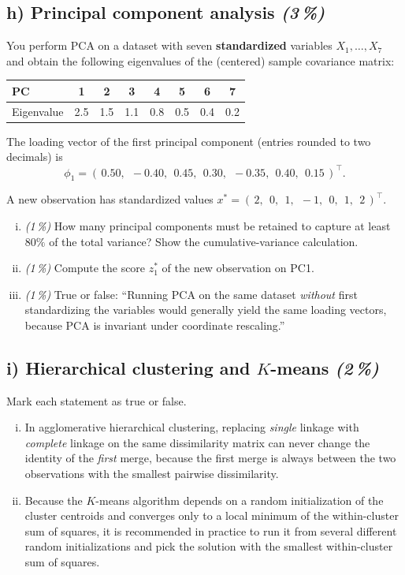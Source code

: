 \documentclass[11pt,a4paper]{article}
\newcommand{\subpoints}[1]{\textit{(#1\,\%)}}
\begin{document}
\subsection*{h) Principal component analysis \subpoints{3}}
You perform PCA on a dataset with seven \textbf{standardized} variables $X_1,\dots,X_7$ and obtain the following eigenvalues of the (centered) sample covariance matrix:
\begin{center}\small
\begin{tabular}{lccccccc}
\toprule
PC               & 1   & 2   & 3   & 4   & 5   & 6   & 7   \\
\midrule
Eigenvalue       & 2.5 & 1.5 & 1.1 & 0.8 & 0.5 & 0.4 & 0.2 \\
\bottomrule
\end{tabular}
\end{center}

The loading vector of the first principal component (entries rounded to two decimals) is
$$\phi_1 = (\,0.50,\;\, -0.40,\;\, 0.45,\;\, 0.30,\;\, -0.35,\;\, 0.40,\;\, 0.15\,)^\top.$$

A new observation has standardized values $x^* = (\,2,\;\, 0,\;\, 1,\;\, -1,\;\, 0,\;\, 1,\;\, 2\,)^\top$.

\begin{enumerate}[(i)]
  \item \subpoints{1} How many principal components must be retained to capture at least $80\%$ of the total variance? Show the cumulative-variance calculation.
  \item \subpoints{1} Compute the score $z^*_1$ of the new observation on PC1.
  \item \subpoints{1} True or false: ``Running PCA on the same dataset \emph{without} first standardizing the variables would generally yield the same loading vectors, because PCA is invariant under coordinate rescaling.''
\end{enumerate}

\subsection*{i) Hierarchical clustering and $K$-means \subpoints{2}}
Mark each statement as true or false.
\begin{enumerate}[(i)]
  \item In agglomerative hierarchical clustering, replacing \emph{single} linkage with \emph{complete} linkage on the same dissimilarity matrix can never change the identity of the \emph{first} merge, because the first merge is always between the two observations with the smallest pairwise dissimilarity.
  \item Because the $K$-means algorithm depends on a random initialization of the cluster centroids and converges only to a local minimum of the within-cluster sum of squares, it is recommended in practice to run it from several different random initializations and pick the solution with the smallest within-cluster sum of squares.
\end{enumerate}
\end{document}
